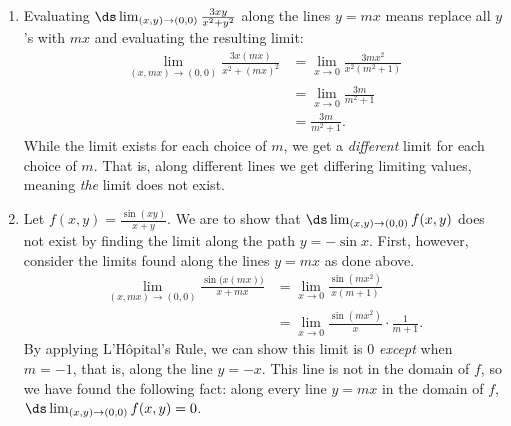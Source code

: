 
{\begin{enumerate}
	\item Evaluating $\ds \lim_{(x,y)\to (0,0)} \frac{3xy}{x^2+y^2}$ along the lines $y=mx$ means replace all $y$'s with $mx$ and evaluating the resulting limit:
	\begin{align*}
	\lim_{(x,mx)\to (0,0)} \frac{3x(mx)}{x^2+(mx)^2} &=\lim_{x\to 0} \frac{3mx^2}{x^2(m^2+1)}\\
				&= \lim_{x\to 0} \frac{3m}{m^2+1}\\
				&= \frac{3m}{m^2+1}.
	\end{align*}
	While the limit exists for each choice of $m$, we get a \emph{different} limit for each choice of $m$. That is, along different lines we get differing limiting values, meaning \emph{the} limit does not exist.
	
	\item		Let $f(x,y) = \frac{\sin(xy)}{x+y}$. We are to show that $\ds \lim_{(x,y)\to (0,0)} f(x,y)$ does not exist by finding the limit along the path $y=-\sin x$. First, however, consider the limits found along the lines $y=mx$ as done above.
	\begin{align*}
	\lim_{(x,mx)\to (0,0)} \frac{\sin\big(x(mx)\big)}{x+mx} &= \lim_{x\to 0} \frac{\sin (mx^2)}{x(m+1)} \\
	&= \lim_{x\to 0} \frac{\sin(mx^2)}{x}\cdot\frac1{m+1}.
	\end{align*}
	By applying L'H\^opital's Rule, we can show this limit is 0 \emph{except} when $m=-1$, that is, along the line $y=-x$. This line is not in the domain of $f$, so we have found the following fact: along every line $y=mx$ in the domain of $f$, $\ds \lim_{(x,y)\to(0,0)} f(x,y)=0$. %
\drawexampleline
	

\end{enumerate}}
